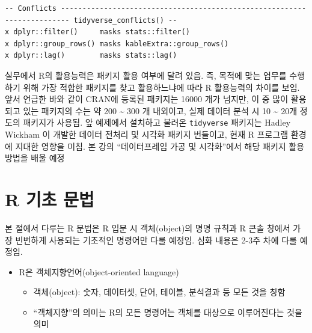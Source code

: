 \documentclass[
  11pt,
]{krantz}
\providecommand{\tightlist}{%
  \setlength{\itemsep}{0pt}\setlength{\parskip}{0pt}}
\let\BeginKnitrBlock\begin \let\EndKnitrBlock\end
\begin{document}
\begin{verbatim}
-- Conflicts ------------------------------------------------------------------------ tidyverse_conflicts() --
x dplyr::filter()     masks stats::filter()
x dplyr::group_rows() masks kableExtra::group_rows()
x dplyr::lag()        masks stats::lag()
\end{verbatim}

\normalsize

\footnotesize

\BeginKnitrBlock{rmdnote}
실무에서 R의 활용능력은 패키지 활용 여부에 달려 있음. 즉, 목적에 맞는 업무를 수행하기 위해 가장 적합한 패키지를 찾고 활용하느냐에 따라 R 활용능력의 차이를 보임. 앞서 언급한 바와 같이 CRAN에 등록된 패키지는 16000 개가 넘지만, 이 중 많이 활용되고 있는 패키지의 수는 약 200 \textasciitilde{} 300 개 내외이고, 실제 데이터 분석 시 10 \textasciitilde{} 20개 정도의 패키지가 사용됨. 앞 예제에서 설치하고 불러온 \texttt{tidyverse} 패키지는 Hadley Wickham \citep{tidyverse2019}이 개발한 데이터 전처리 및 시각화 패키지 번들이고, 현재 R 프로그램 환경에 지대한 영향을 미침. 본 강의 ``데이터프레임 가공 및 시각화''에서 해당 패키지 활용 방법을 배울 예정
\EndKnitrBlock{rmdnote}

\normalsize

\hypertarget{r-basic}{%
\section{R 기초 문법}\label{r-basic}}

\footnotesize

\BeginKnitrBlock{rmdnote}
본 절에서 다루는 R 문법은 R 입문 시 객체(object)의 명명 규칙과 R 콘솔 창에서 가장 빈번하게 사용되는 기초적인 명령어만 다룰 예정임. 심화 내용은 2-3주 차에 다룰 예정임.
\EndKnitrBlock{rmdnote}

\normalsize

\begin{itemize}
\tightlist
\item
  R은 객체지향언어(object-oriented language)

  \begin{itemize}
  \tightlist
  \item
    객체(object): 숫자, 데이터셋, 단어, 테이블, 분석결과 등 모든 것을 칭함
  \item
    ``객체지향''의 의미는 R의 모든 명령어는 객체를 대상으로 이루어진다는 것을 의미
  \end{itemize}
\end{itemize}

\footnotesize
\end{document}
